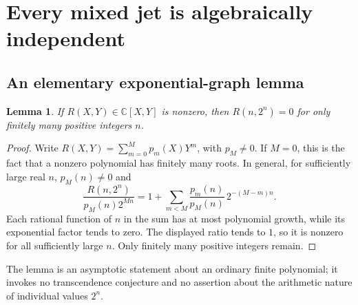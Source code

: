 \documentclass[11pt,a4paper]{article}
\numberwithin{equation}{section}
\newtheorem{lemma}[theorem]{Lemma}
\theoremstyle{definition}
\theoremstyle{remark}
\newcommand{\C}{\mathbb C}
\begin{document}
\section{Every mixed jet is algebraically independent}\label{tail:sec:mixed}

\subsection{An elementary exponential-graph lemma}
\begin{lemma}\label{tail:lem:expgraph}
If $R(X,Y)\in\C[X,Y]$ is nonzero, then $R(n,2^n)=0$ for only finitely
many positive integers $n$.
\end{lemma}
\begin{proof}
Write $R(X,Y)=\sum_{m=0}^M p_m(X)Y^m$, with $p_M\ne0$.
If $M=0$, this is the fact that a nonzero polynomial has finitely many
roots. In general, for sufficiently large real $n$, $p_M(n)\ne0$ and
\[
 \frac{R(n,2^n)}{p_M(n)2^{Mn}}
   =1+\sum_{m<M}\frac{p_m(n)}{p_M(n)}\,2^{-(M-m)n}.
\]
Each rational function of $n$ in the sum has at most polynomial growth,
while its exponential factor tends to zero. The displayed ratio tends
to $1$, so it is nonzero for all sufficiently large $n$. Only finitely
many positive integers remain.
\end{proof}

The lemma is an asymptotic statement about an ordinary finite polynomial;
it invokes no transcendence conjecture and no assertion about the
arithmetic nature of individual values $2^n$.
\end{document}
